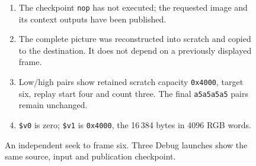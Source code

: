 \begin{figure}[htbp]
  \par\smallskip
  \begin{minipage}{\linewidth}
    \small
    \begin{enumerate}
      \item The checkpoint \texttt{nop} has not executed; the requested image and its context outputs have been published.
      \item The complete picture was reconstructed into scratch and copied to the destination. It does not depend on a previously displayed frame.
      \item Low/high pairs show retained scratch capacity \texttt{0x4000}, target six, replay start four and count three. The final \texttt{a5a5a5a5} pairs remain unchanged.
      \item \texttt{\$v0} is zero; \texttt{\$v1} is \texttt{0x4000}, the 16\,384 bytes in 4096 RGB words.
    \end{enumerate}
  \end{minipage}
  \caption{An independent seek to frame six. Three Debug launches show the same source, input and publication checkpoint.}
  \label{fig:video-independent-seek}
\end{figure}
